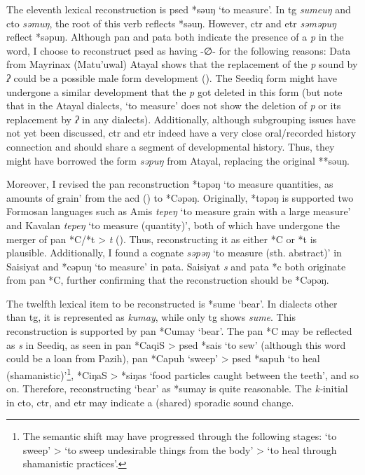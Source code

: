 The eleventh lexical reconstruction is \acl{psed} *səuŋ `to measure'. In \acl{tg} \textit{sumeuŋ} and \acl{cto} \textit{səmuŋ}, the root of this verb reflects *səuŋ. However, \acl{ctr} and \acl{etr} \textit{səməpuŋ} reflect *səpuŋ. Although \acl{pan} and \acl{pata} both indicate the presence of a \textit{p} in the word, I choose to reconstruct \acl{psed} as having -∅- for the following reasons: Data from Mayrinax (Matu'uwal) Atayal shows that the replacement of the \textit{p} sound by \textit{ʔ} could be a possible male form development (\cite[12]{li1983gender}). The Seediq form might have undergone a similar development that the \textit{p} got deleted in this form (but note that in the Atayal dialects, `to measure' does not show the deletion of \textit{p} or its replacement by \textit{ʔ} in any dialects). Additionally, although subgrouping issues have not yet been discussed, \acl{ctr} and \acl{etr} indeed have a very close oral/recorded history connection and should share a segment of developmental history. Thus, they might have borrowed the form \textit{səpuŋ} from Atayal, replacing the original **səuŋ.

Moreover, I revised the \acs{pan} reconstruction *təpəŋ `to measure quantities, as amounts of grain' from the \ac{acd} (\cite{ACD}) to *Cəpəŋ. Originally, *təpəŋ is supported two Formosan languages such as Amis \textit{tepeŋ} `to measure grain with a large measure' and Kavalan \textit{tepeŋ} `to measure (quantity)', both of which have undergone the merger of \acs{pan} *C/*t > \textit{t} (\cite[44]{blust1999subgrouping}). Thus, reconstructing it as either *C or *t is plausible. Additionally, I found a cognate \textit{səpəŋ} `to measure (sth. abstract)' in Saisiyat and *cəpuŋ `to measure' in \acl{pata}. Saisiyat \textit{s} and \acl{pata} *c both originate from \acs{pan} *C, further confirming that the reconstruction should be *Cəpəŋ.


The twelfth lexical item to be reconstructed is *sume `bear'. In dialects other than \acl{tg}, it is represented as \textit{kumay}, while only \acl{tg} shows \textit{sume}. This reconstruction is supported by \acs{pan} *Cumay `bear'. The \acs{pan} *C may be reflected as \textit{s} in Seediq, as seen in \acs{pan} *CaqiS > \acs{psed} *sais `to sew' (although this word could be a loan from Pazih), \acs{pan} *Capuh `sweep' > \acs{psed} *sapuh `to heal (shamanistic)'\footnote{The semantic shift may have progressed through the following stages: `to sweep' > `to sweep undesirable things from the body' > `to heal through shamanistic practices'.}, *CiŋaS > *siŋas `food particles caught between the teeth', and so on. Therefore, reconstructing `bear' as *sumay is quite reasonable. The \textit{k-}initial in \acl{cto}, \acl{ctr}, and \acl{etr} may indicate a (shared) sporadic sound change.

